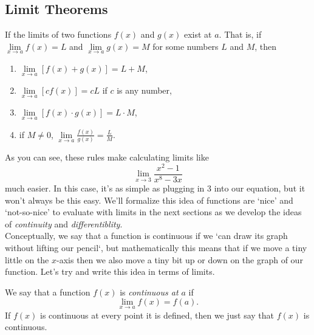 \subsection{Limit Theorems}

\begin{thm}\label{LimRules}
If the limits of two functions $f(x)$ and $g(x)$ exist at $a$. That is, if $\lim\limits_{x\to a}f(x)=L$ and $\lim\limits_{x\to a}g(x)=M$ for some numbers $L$ and $M$, then
	\begin{enumerate}
		\item $\lim\limits_{x\to a}\left[f(x)+g(x)\right]=L+M$,
		\item $\lim\limits_{x\to a}\left[cf(x)\right]=cL$ if $c$ is any number,
		\item  $\lim\limits_{x\to a}\left[f(x)\cdot g(x)\right]=L\cdot M$,
		\item if $M\neq 0$, $\lim\limits_{x\to a}\frac{f(x)}{g(x)}=\frac{L}{M}$.
		\end{enumerate}
\end{thm}

As you can see, these rules make calculating limits like
\begin{equation}
\lim\limits_{x\to 3}\frac{x^2-1}{x^8-3x}
\end{equation}
much easier. In this case, it's as simple as plugging in 3 into our equation, but it won't always be this easy. We'll formalize this idea of functions are `nice' and  `not-so-nice' to evaluate with limits in the next sections as we develop the ideas of \textit{continuity} and \textit{differentiblity}.\\


Conceptually, we say that a function is continuous if we `can draw its graph without lifting our pencil`, but mathematically this means that if we move a tiny little on the $x$-axis then we also move a tiny bit up or down on the graph of our function. Let's try and write this idea in terms of limits.

\begin{defn}
We say that a function $f(x)$ is \emph{continuous at $a$} if \begin{equation}
	\lim\limits_{x\to a}f(x)=f(a).
\end{equation}
If $f(x)$ is continuous at every point it is defined, then we just say that $f(x)$ is continuous.
\end{defn}


